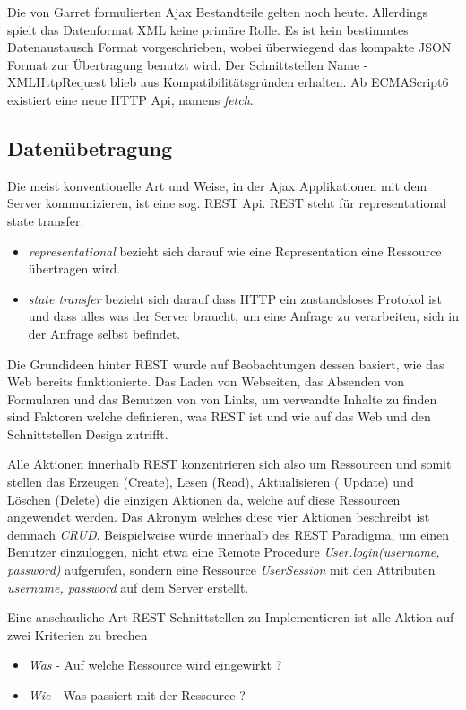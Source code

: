 Die von Garret formulierten Ajax Bestandteile gelten noch heute. Allerdings spielt das Datenformat XML keine primäre Rolle. Es ist kein bestimmtes Datenaustausch Format vorgeschrieben, wobei überwiegend das kompakte JSON Format zur Übertragung benutzt wird. Der Schnittstellen Name - XMLHttpRequest blieb aus Kompatibilitätsgründen erhalten. Ab ECMAScript6 existiert eine neue HTTP Api, namens \emph{fetch}.

\subsection{Datenübetragung}

Die meist konventionelle Art und Weise, in der Ajax Applikationen mit dem Server kommunizieren, ist eine sog. REST Api. REST steht für representational state transfer.    

\begin{itemize} 
\item \emph{representational} bezieht sich darauf wie eine Representation eine Ressource übertragen wird.
\item \emph{state transfer} bezieht sich darauf dass HTTP ein zustandsloses Protokol ist und dass alles was der Server braucht, um eine Anfrage zu verarbeiten, sich in der Anfrage selbst befindet.
\end{itemize}

Die Grundideen hinter REST wurde auf Beobachtungen dessen basiert, wie das Web bereits funktionierte. Das Laden von Webseiten, das Absenden von Formularen und das Benutzen von von Links, um verwandte Inhalte zu finden sind Faktoren welche definieren, was REST ist und wie auf das Web und den Schnittstellen Design zutrifft. 

Alle Aktionen innerhalb REST konzentrieren sich also um Ressourcen und somit stellen das Erzeugen (Create), Lesen (Read), Aktualisieren ( Update) und Löschen (Delete) die einzigen Aktionen da, welche auf diese Ressourcen angewendet werden. Das Akronym welches diese vier Aktionen beschreibt ist demnach \emph{CRUD}. Beispielweise würde innerhalb des REST Paradigma, um einen Benutzer einzuloggen, nicht etwa eine Remote Procedure \emph{User.login(username, password)} aufgerufen, sondern eine Ressource \emph{UserSession} mit den Attributen \emph{username, password} auf dem Server erstellt.

Eine anschauliche Art REST Schnittstellen zu Implementieren ist alle Aktion auf zwei Kriterien zu brechen 

\begin{itemize}
 \item \emph{Was} - Auf welche Ressource wird eingewirkt ?
 \item \emph{Wie} - Was passiert mit der Ressource ?
\end{itemize}

